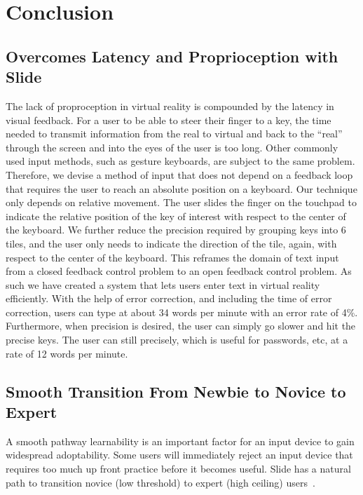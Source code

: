 \section{Conclusion}

\subsection{Overcomes Latency and Proprioception with Slide}


The lack of proproception in virtual reality is compounded by the latency in visual feedback.
For a user to be able to steer their finger to a key, the time needed to transmit information from the real to virtual and back to the ``real'' through the  screen and into the eyes of the user is too long.  Other commonly used input methods, such as gesture keyboards, are subject to the same problem.
Therefore, we devise a method of input that does not depend on a feedback loop that requires the user to reach an absolute position on a keyboard.  
Our technique only depends on relative movement. The user slides the finger on the touchpad to indicate the relative position of the key of interest with respect to the center of the keyboard.  We further reduce the precision required by grouping keys into 6 tiles, and the user only needs to indicate the direction of the tile, again, with respect to the center of the keyboard.
This reframes the domain of text input from a closed  feedback control problem to an open feedback control problem.
As such we have created a system that lets users enter text in virtual reality efficiently.  With the help of error correction, and including the time of error correction, users can type at about 34 words per minute with an error rate of 4\%.  Furthermore, when precision is desired, the user can simply go slower and hit the precise keys.  The user can still precisely, which is useful for passwords, etc, at a rate of 12 words per minute. 

\subsection{Smooth Transition From Newbie to Novice to Expert }

A smooth pathway learnability is an important factor for an input device to gain widespread adoptability.
Some users will immediately reject an input device that requires too much up front practice before it becomes useful.
Slide has a natural path to transition novice (low threshold) to expert (high ceiling) users~\cite{grover2013computational}.

